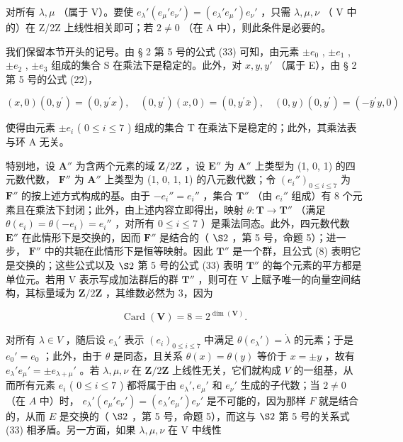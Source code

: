 对所有 \(\lambda, \mu\) （属于 V）。要使 \(e_{\lambda}'(e_{\mu}'e_{\nu}') = (e_{\lambda}'e_{\mu}')e_{\nu}'\) ，只需 \(\lambda, \mu, \nu\) （ V 中的）在 Z/2Z 上线性相关即可；若 \(2 \neq 0\) （在 A 中），则此条件是必要的。

我们保留本节开头的记号。由 § 2 第 5 号的公式 (33) 可知，由元素 \(\pm e_0\) , \(\pm e_1\) , \(\pm e_2\) , \(\pm e_3\) 组成的集合 S 在乘法下是稳定的。此外，对 \(x, y, y'\) （属于 E），由 § 2 第 5 号的公式 (22)，

\[
(x, 0) (0, y ^ {\prime}) = (0, y ^ {\prime} x), \quad (0, y ^ {\prime}) (x, 0) = (0, y ^ {\prime} \bar {x}), \quad (0, y) (0, y ^ {\prime}) = (- \bar {y} ^ {\prime} y, 0)\tag{8}
\]

使得由元素 \(\pm e_{i}\) ( \(0 \leqslant i \leqslant 7\) ) 组成的集合 T 在乘法下是稳定的；此外，其乘法表与环 A 无关。

特别地，设 \(\mathbf{A}''\) 为含两个元素的域 \(\mathbf{Z}/2\mathbf{Z}\) ，设 \(\mathbf{E}''\) 为 \(\mathbf{A}''\) 上类型为 (1, 0, 1) 的四元数代数， \(\mathbf{F}''\) 为 \(\mathbf{A}''\) 上类型为 (1, 0, 1, 1) 的八元数代数；令 \((e_i'')_{0 \leq i \leq 7}\) 为 \(\mathbf{F}''\) 的按上述方式构成的基。由于 \(-e_i'' = e_i''\) ，集合 \(\mathbf{T}''\) （由 \(e_i''\) 组成）有 8 个元素且在乘法下封闭；此外，由上述内容立即得出，映射 \(\theta: \mathbf{T} \to \mathbf{T}''\) （满足 \(\theta(e_i) = \theta(-e_i) = e_i''\) ，对所有 \(0 \leq i \leq 7\) ）是乘法同态。此外，四元数代数 \(\mathbf{E}''\) 在此情形下是交换的，因而 \(\mathbf{F}''\) 是结合的（ \(\S 2\) ，第 5 号，命题 5）；进一步， \(\mathbf{F}''\) 中的共轭在此情形下是恒等映射。因此 \(\mathbf{T}''\) 是一个群，且公式 (8) 表明它是交换的；这些公式以及 \(\S 2\) 第 5 号的公式 (33) 表明 \(\mathbf{T}''\) 的每个元素的平方都是单位元。若用 V 表示写成加法群后的群 \(\mathbf{T}''\) ，则可在 V 上赋予唯一的向量空间结构，其标量域为 \(\mathbf{Z}/2\mathbf{Z}\) ，其维数必然为 3，因为

\[
\operatorname{Card} (\mathbf {V}) = 8 = 2 ^ {\dim (\mathbf {V})}.
\]

对所有 \(\lambda \in V\) ，随后设 \(e_{\lambda}'\) 表示 \((e_i)_{0 \leq i \leq 7}\) 中满足 \(\theta(e_{\lambda}') = \dot{\lambda}\) 的元素；于是 \(e_0' = e_0\) ；此外，由于 \(\theta\) 是同态，且关系 \(\theta(x) = \theta(y)\) 等价于 \(x = \pm y\) ，故有 \(e_{\lambda}' e_{\mu}' = \pm e_{\lambda + \mu}'\) 。若 \(\lambda, \mu, \nu\) 在 \(\mathbf{Z}/2\mathbf{Z}\) 上线性无关，它们就构成 \(V\) 的一组基，从而所有元素 \(e_i\) ( \(0 \leqslant i \leqslant 7\) ) 都将属于由 \(e_{\lambda}', e_{\mu}'\) 和 \(e_{\nu}'\) 生成的子代数；当 \(2 \neq 0\) （在 \(A\) 中）时， \(e_{\lambda}'(e_{\mu}' e_{\nu}') = (e_{\lambda}' e_{\mu}') e_{\nu}'\) 是不可能的，因为那样 \(F\) 就是结合的，从而 \(E\) 是交换的（ \(\S 2\) ，第 5 号，命题 5），而这与 \(\S 2\) 第 5 号的关系式 (33) 相矛盾。另一方面，如果 \(\lambda, \mu, \nu\) 在 V 中线性


